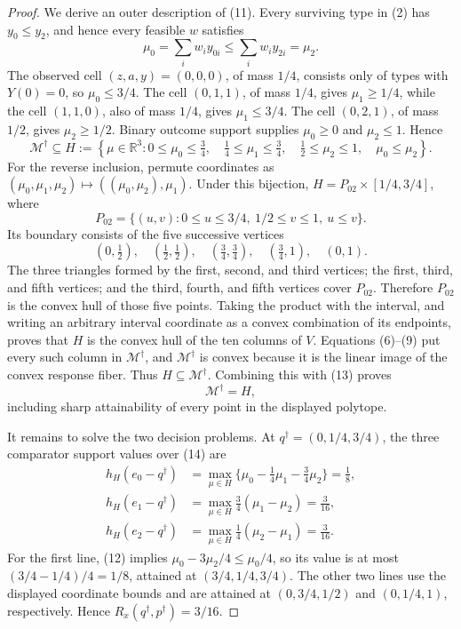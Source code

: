 \documentclass{article}
\begin{document}
\begin{proof}
We derive an outer description of (11).  Every surviving type in (2) has \(y_0\leq y_2\), and hence every feasible \(w\) satisfies
\[
 \mu_0=\sum_iw_i y_{0i}\leq\sum_iw_i y_{2i}=\mu_2.
 \tag{12}
\]
The observed cell \((z,a,y)=(0,0,0)\), of mass \(1/4\), consists only of types with \(Y(0)=0\), so \(\mu_0\leq3/4\).  The cell \((0,1,1)\), of mass \(1/4\), gives \(\mu_1\geq1/4\), while the cell \((1,1,0)\), also of mass \(1/4\), gives \(\mu_1\leq3/4\).  The cell \((0,2,1)\), of mass \(1/2\), gives \(\mu_2\geq1/2\).  Binary outcome support supplies \(\mu_0\geq0\) and \(\mu_2\leq1\).  Hence
\[
 \mathcal M^\dagger\subseteq H:=
 \left\{\mu\in\mathbb R^3:
 0\leq\mu_0\leq\tfrac34,\quad
 \tfrac14\leq\mu_1\leq\tfrac34,\quad
 \tfrac12\leq\mu_2\leq1,\quad
 \mu_0\leq\mu_2\right\}.
 \tag{13}
\]
For the reverse inclusion, permute coordinates as
\((\mu_0,\mu_1,\mu_2)\mapsto((\mu_0,\mu_2),\mu_1)\).  Under this bijection,
\(H=P_{02}\times[1/4,3/4]\), where
\[
P_{02}=\{(u,v):0\leq u\leq3/4,\ 1/2\leq v\leq1,\ u\leq v\}.
\]
Its boundary consists of the five successive vertices
\[
 (0,\tfrac12),\quad(\tfrac12,\tfrac12),\quad
 (\tfrac34,\tfrac34),\quad(\tfrac34,1),\quad(0,1).
\]
The three triangles formed by the first, second, and third vertices; the first, third, and fifth vertices; and the third, fourth, and fifth vertices cover \(P_{02}\).  Therefore \(P_{02}\) is the convex hull of those five points.  Taking the product with the interval, and writing an arbitrary interval coordinate as a convex combination of its endpoints, proves that \(H\) is the convex hull of the ten columns of \(V\).  Equations (6)--(9) put every such column in \(\mathcal M^\dagger\), and \(\mathcal M^\dagger\) is convex because it is the linear image of the convex response fiber.  Thus \(H\subseteq\mathcal M^\dagger\).  Combining this with (13) proves
\[
 \mathcal M^\dagger=H,
 \tag{14}
\]
including sharp attainability of every point in the displayed polytope.

It remains to solve the two decision problems.  At \(q^\dagger=(0,1/4,3/4)\), the three comparator support values over (14) are
\[
\begin{aligned}
h_H(e_0-q^\dagger)
 &=\max_{\mu\in H}\{\mu_0-\tfrac14\mu_1-\tfrac34\mu_2\}=\tfrac18,\\
h_H(e_1-q^\dagger)
 &=\max_{\mu\in H}\tfrac34(\mu_1-\mu_2)=\tfrac3{16},\\
h_H(e_2-q^\dagger)
 &=\max_{\mu\in H}\tfrac14(\mu_2-\mu_1)=\tfrac3{16}.
\end{aligned}
\tag{15}
\]
For the first line, (12) implies \(\mu_0-3\mu_2/4\leq\mu_0/4\), so its value is at most \((3/4-1/4)/4=1/8\), attained at \((3/4,1/4,3/4)\).  The other two lines use the displayed coordinate bounds and are attained at \((0,3/4,1/2)\) and \((0,1/4,1)\), respectively.  Hence \(R_x(q^\dagger,p^\dagger)=3/16\).


\end{proof}
\end{document}
